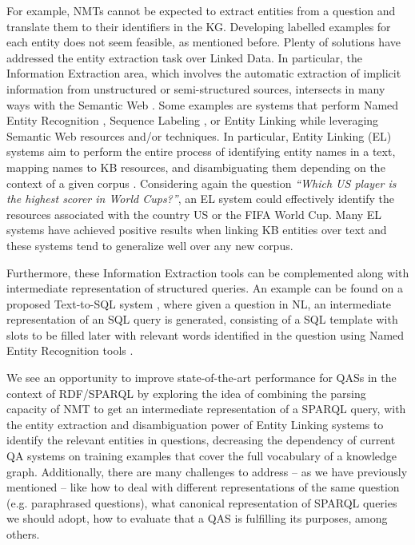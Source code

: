 For example, NMTs cannot be expected to extract entities from a question and translate them to their identifiers in the KG. 
Developing labelled examples for each entity does not seem feasible, as mentioned before. 
Plenty of solutions have addressed the entity extraction task over Linked Data. In particular, 
the Information Extraction area, which involves the automatic extraction of implicit 
information from unstructured or semi-structured sources, intersects in many ways with the 
Semantic Web \cite{infExtr:MartinezHL19}. Some examples are systems that perform Named Entity 
Recognition \cite{ner:LampleBSKD16}, Sequence Labeling \cite{seqlab:MaH16, seqlab:contextual-emb-AkbikBV18}, 
or Entity Linking \cite{EL:dbpedia-spotlight-MendesJGB11, EL:aida-tool-YosefHBSW11, EL:tagme-FerraginaS10, EL:opentapioca-Delpeuch19} 
while leveraging Semantic Web resources and/or techniques. 
In particular, Entity Linking (EL) systems aim to perform the entire process of identifying entity names in a 
text, mapping names to KB resources, and disambiguating them depending on the context 
of a given corpus \cite{EL:survey-WuHH18}. Considering again the question \textit{“Which US player is the highest scorer 
in World Cups?”}, an EL system could effectively identify the resources associated with the 
country US or the FIFA World Cup. Many EL systems \cite{EL:dbpedia-spotlight-MendesJGB11, EL:aida-tool-YosefHBSW11, EL:tagme-FerraginaS10, EL:opentapioca-Delpeuch19} 
have achieved positive results when linking KB entities over text and these systems tend to generalize well 
over any new corpus. 

Furthermore, these Information Extraction tools can be complemented along with intermediate 
representation of structured queries. An example can be found on a proposed 
Text-to-SQL system \cite{semPar:txt-to-sql-RadevKZZFRS18}, where given a question in NL, an intermediate representation of 
an SQL query is generated, consisting of a SQL template with slots to be filled later with 
relevant words identified in the question using Named Entity Recognition tools \cite{ner:dynet-NeubigDGMAABCCC17}.

We see an opportunity to improve state-of-the-art performance for QASs in the context 
of RDF/SPARQL by exploring the idea of combining the parsing capacity of NMT to get an 
intermediate representation of a SPARQL query, with the entity extraction and disambiguation 
power of Entity Linking systems to identify the relevant entities in questions, decreasing 
the dependency of current QA systems on training examples that cover the full vocabulary of a 
knowledge graph. Additionally, there are many challenges to address – as we have previously mentioned 
– like how to deal with different representations of the same question (e.g. paraphrased questions), 
what canonical representation of SPARQL queries we should adopt, how to evaluate 
that a QAS is fulfilling its purposes, among others.
